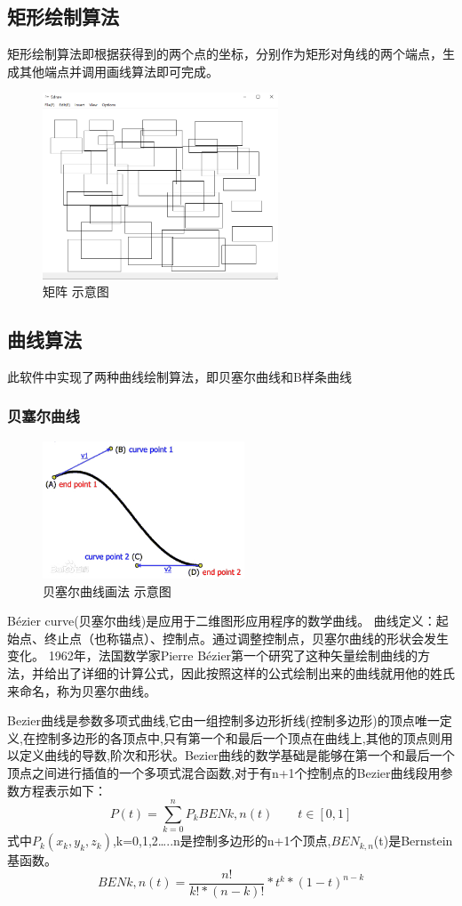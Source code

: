 \documentclass[a4paper,UTF8]{article}
\theoremstyle{definition}
\begin{document}
\subsection{矩形绘制算法}
矩形绘制算法即根据获得到的两个点的坐标，分别作为矩形对角线的两个端点，生成其他端点并调用画线算法即可完成。
\begin{figure}[ht]
\centering
\includegraphics[width=7cm]{x6.png}
\caption{矩阵 示意图}
\label{x6}
\end{figure}
\subsection{曲线算法}
此软件中实现了两种曲线绘制算法，即贝塞尔曲线和B样条曲线
\subsubsection{贝塞尔曲线}
\begin{figure}[ht]
\centering
\includegraphics[width=6cm]{x15.jpg}
\caption{贝塞尔曲线画法 示意图}
\label{x5}
\end{figure}
\par
Bézier curve(贝塞尔曲线)是应用于二维图形应用程序的数学曲线。 曲线定义：起始点、终止点（也称锚点）、控制点。通过调整控制点，贝塞尔曲线的形状会发生变化。 1962年，法国数学家Pierre Bézier第一个研究了这种矢量绘制曲线的方法，并给出了详细的计算公式，因此按照这样的公式绘制出来的曲线就用他的姓氏来命名，称为贝塞尔曲线。
\par Bezier曲线是参数多项式曲线,它由一组控制多边形折线(控制多边形)的顶点唯一定义,在控制多边形的各顶点中,只有第一个和最后一个顶点在曲线上,其他的顶点则用以定义曲线的导数,阶次和形状。Bezier曲线的数学基础是能够在第一个和最后一个顶点之间进行插值的一个多项式混合函数,对于有n+1个控制点的Bezier曲线段用参数方程表示如下：
\begin{equation}
P(t)=\sum_{k=0}^n P_{k} BEN{k,n}(t)\qquad t\in [0,1]
\end{equation}
式中$P_{k}(x_{k},y_{k},z_{k})$,k=0,1,2…..n是控制多边形的n+1个顶点,$BEN_{k,n}$(t)是Bernstein基函数。
\begin{equation}
 BEN{k,n}(t)=\frac{n!}{k!*(n-k)!} *t^k*(1-t)^{n-k}
\end{equation}
\end{document}
